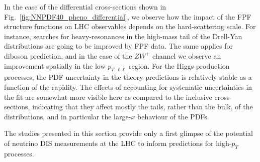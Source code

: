 In the case of the differential cross-sections shown in Fig.~\ref{fig:NNPDF40_pheno_differential},
we observe how the impact of the FPF structure functions on LHC observables depends
on the hard-scattering scale.
%
For instance, searches for heavy-resonances in the high-mass tail of the Drell-Yan
distributions are going to be improved by FPF data.
%
The same applies for diboson prediction, and in the case of the $ZW^+$ channel we observe
an improvement spatially in the low $p_{T,\ell\bar{\ell}}$ region.
%
For the Higgs production processes, the PDF uncertainty in the theory predictions is relatively
stable as a function of the rapidity.
%
The effects of accounting for systematic uncertainties in the fit are somewhat more visible
here as compared to the inclusive cross-sections, indicating that they affect mostly
the tails, rather than the bulk, of the distributions, and in particular the large-$x$
behaviour of the PDFs.



The studies presented in this section provide only a first glimpse of the potential
of neutrino DIS measurements at the LHC to inform predictions for high-$p_T$ processes.


